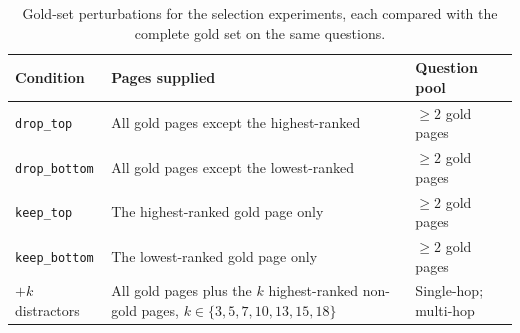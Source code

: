 \begin{table}[h]
\centering
\small
\setlength{\tabcolsep}{5pt}
\renewcommand{\arraystretch}{1.15}
\begin{tabularx}{\linewidth}{@{}>{\raggedright\arraybackslash}p{2.4cm}>{\raggedright\arraybackslash}X>{\raggedright\arraybackslash}p{3.0cm}@{}}
\toprule
Condition & Pages supplied & Question pool \\
\midrule
\texttt{drop\_top}    & All gold pages except the highest-ranked & $\geq 2$ gold pages \\
\texttt{drop\_bottom} & All gold pages except the lowest-ranked  & $\geq 2$ gold pages \\
\texttt{keep\_top}    & The highest-ranked gold page only        & $\geq 2$ gold pages \\
\texttt{keep\_bottom} & The lowest-ranked gold page only         & $\geq 2$ gold pages \\
\midrule
$+k$ distractors & All gold pages plus the $k$ highest-ranked non-gold pages, $k \in \{3,5,7,10,13,15,18\}$ & Single-hop; multi-hop \\
\bottomrule
\end{tabularx}
\caption{Gold-set perturbations for the selection experiments, each compared with the complete gold set on the same questions.}
\label{tab:page_set}
\end{table}